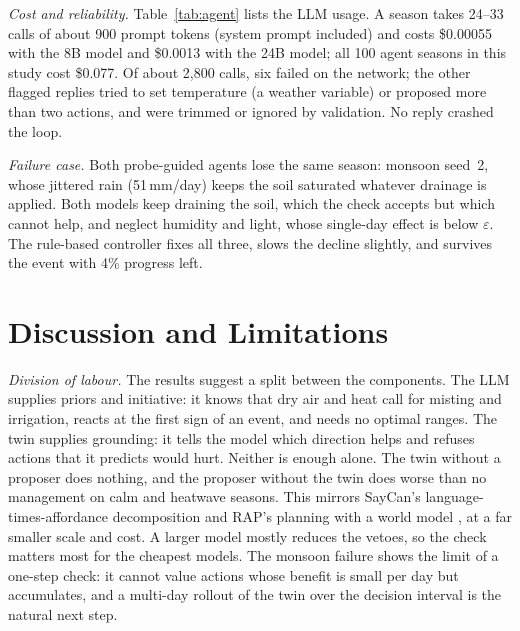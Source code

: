 \documentclass[conference]{IEEEtran}
\begin{document}
\begin{table}[t]
\centering
\caption{Agent behaviour per season (means over 25 seasons)}
\label{tab:agent}
\scriptsize
\setlength{\tabcolsep}{2.5pt}

\end{table}

\textit{Cost and reliability.} Table~\ref{tab:agent} lists the LLM usage. A season takes 24--33
calls of about 900 prompt tokens (system prompt included) and costs \$0.00055 with the 8B model
and \$0.0013 with the 24B model; all 100 agent seasons in this study cost \$0.077. Of about 2{,}800
calls, six failed on the network; the other flagged replies tried to set temperature (a weather
variable) or proposed more than two actions, and were trimmed or ignored by validation. No reply
crashed the loop.

\textit{Failure case.} Both probe-guided agents lose the same season: monsoon seed~2, whose
jittered rain (51\,mm/day) keeps the soil saturated whatever drainage is applied. Both
models keep draining the soil, which the check accepts but which cannot help, and neglect humidity
and light, whose single-day effect is below $\varepsilon$. The rule-based controller fixes all
three, slows the decline slightly, and survives the event with 4\% progress left.

\section{Discussion and Limitations}

\textit{Division of labour.} The results suggest a split between the components. The LLM supplies
priors and initiative: it knows that dry air and heat call for misting and irrigation, reacts
at the first sign of an event, and needs no optimal ranges. The twin supplies grounding: it
tells the model which direction helps and refuses actions that it predicts would hurt. Neither
is enough alone. The twin without a proposer does nothing, and the proposer without the twin
does worse than no management on calm and heatwave seasons. This mirrors SayCan's
language-times-affordance decomposition \cite{ahn2022saycan} and RAP's planning with a world
model \cite{hao2023reasoning}, at a far smaller scale and cost. A larger model mostly
reduces the vetoes, so the check matters most for the cheapest models. The monsoon failure
shows the limit of a one-step check: it cannot value actions whose benefit is small per day
but accumulates, and a multi-day rollout of the twin over the decision interval is the natural
next step.
\end{document}
